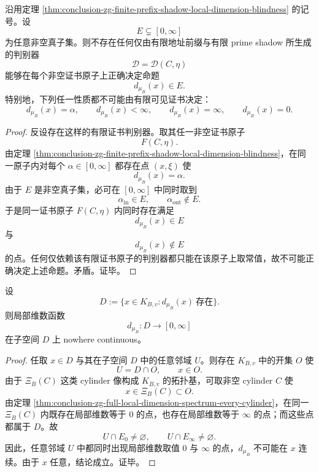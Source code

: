\begin{corollary}[局部维数的任何非平凡判别都不能由有限证书实现]\label{cor:conclusion-zg-no-nontrivial-local-dimension-predicate-from-finite-certificate}
沿用定理 \ref{thm:conclusion-zg-finite-prefix-shadow-local-dimension-blindness} 的记号。设
\[
E\subsetneq [0,\infty]
\]
为任意非空真子集。则不存在任何仅由有限地址前缀与有限 prime shadow 所生成的判别器
\[
\mathcal D=\mathcal D(C,\eta)
\]
能够在每个非空证书原子上正确决定命题
\[
d_{\mu_B}(x)\in E.
\]
特别地，下列任一性质都不可能由有限可见证书决定：
\[
d_{\mu_B}(x)=\alpha,
\qquad
d_{\mu_B}(x)<\infty,
\qquad
d_{\mu_B}(x)=\infty,
\qquad
d_{\mu_B}(x)=0.
\]
\end{corollary}
\begin{proof}
反设存在这样的有限证书判别器。取其任一非空证书原子
\[
F(C,\eta).
\]
由定理 \ref{thm:conclusion-zg-finite-prefix-shadow-local-dimension-blindness}，在同一原子内对每个 \(\alpha\in[0,\infty]\) 都存在点 \((x,\xi)\) 使
\[
d_{\mu_B}(x)=\alpha.
\]
由于 \(E\) 是非空真子集，必可在 \([0,\infty]\) 中同时取到
\[
\alpha_{\mathrm{in}}\in E,
\qquad
\alpha_{\mathrm{out}}\notin E.
\]
于是同一证书原子 \(F(C,\eta)\) 内同时存在满足
\[
d_{\mu_B}(x)\in E
\]
与
\[
d_{\mu_B}(x)\notin E
\]
的点。任何仅依赖该有限证书原子的判别器都只能在该原子上取常值，故不可能正确决定上述命题。矛盾。证毕。
\end{proof}

\begin{proposition}[局部维数观测在其定义域上处处不连续]\label{prop:conclusion-zg-local-dimension-nowhere-continuous}
设
\[
D:=\{x\in K_{B,v}: d_{\mu_B}(x)\ \text{存在}\}.
\]
则局部维数函数
\[
d_{\mu_B}:D\to [0,\infty]
\]
在子空间 \(D\) 上 nowhere continuous。
\end{proposition}
\begin{proof}
任取 \(x\in D\) 与其在子空间 \(D\) 中的任意邻域 \(U\)。则存在 \(K_{B,v}\) 中的开集 \(O\) 使
\[
U=D\cap O,
\qquad
x\in O.
\]
由于 \(\Xi_B(C)\) 这类 cylinder 像构成 \(K_{B,v}\) 的拓扑基，可取非空 cylinder \(C\) 使
\[
x\in \Xi_B(C)\subset O.
\]
由定理 \ref{thm:conclusion-zg-full-local-dimension-spectrum-every-cylinder}，在同一 \(\Xi_B(C)\) 内既存在局部维数等于 \(0\) 的点，也存在局部维数等于 \(\infty\) 的点；而这些点都属于 \(D\)。故
\[
U\cap E_0\neq\varnothing,
\qquad
U\cap E_\infty\neq\varnothing.
\]
因此，任意邻域 \(U\) 中都同时出现局部维数取值 \(0\) 与 \(\infty\) 的点，\(d_{\mu_B}\) 不可能在 \(x\) 连续。由于 \(x\) 任意，结论成立。证毕。
\end{proof}
